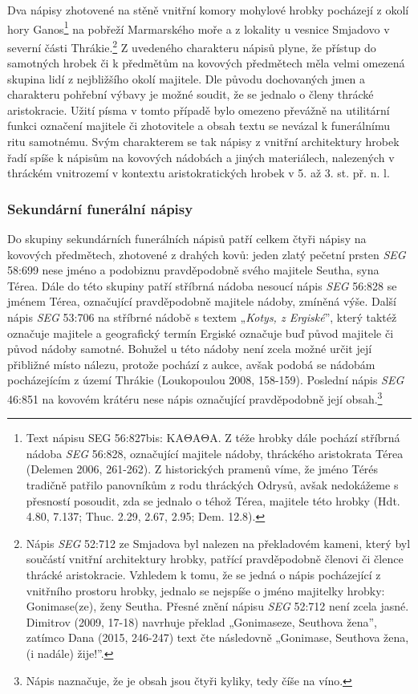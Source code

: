 Dva nápisy zhotovené na stěně vnitřní komory mohylové hrobky pocházejí z okolí hory Ganos\footnote{Text nápisu SEG 56:827bis: ΚΑΘΑΘΑ. Z téže hrobky dále pochází stříbrná nádoba {\em SEG} 56:828, označující majitele nádoby, thráckého aristokrata Térea (Delemen 2006, 261-262). Z historických pramenů víme, že jméno Térés tradičně patřilo panovníkům z rodu thráckých Odrysů, avšak nedokážeme s přesností posoudit, zda se jednalo o téhož Térea, majitele této hrobky (Hdt. 4.80, 7.137; Thuc. 2.29, 2.67, 2.95; Dem. 12.8).} na pobřeží Marmarského moře a z lokality u vesnice Smjadovo v severní části Thrákie.\footnote{Nápis {\em SEG} 52:712 ze Smjadova byl nalezen na překladovém kameni, který byl součástí vnitřní architektury hrobky, patřící pravděpodobně členovi či člence thrácké aristokracie. Vzhledem k tomu, že se jedná o nápis pocházející z vnitřního prostoru hrobky, jednalo se nejspíše o jméno majitelky hrobky: Gonimase(ze), ženy Seutha. Přesné znění nápisu {\em SEG} 52:712 není zcela jasné. Dimitrov (2009, 17-18) navrhuje překlad „Gonimaseze, Seuthova žena”, zatímco Dana (2015, 246-247) text čte následovně „Gonimase, Seuthova žena, (i nadále) žije!”.} Z uvedeného charakteru nápisů plyne, že přístup do samotných hrobek či k předmětům na kovových předmětech měla velmi omezená skupina lidí z nejbližšího okolí majitele. Dle původu dochovaných jmen a charakteru pohřební výbavy je možné soudit, že se jednalo o členy thrácké aristokracie. Užití písma v tomto případě bylo omezeno převážně na utilitární funkci označení majitele či zhotovitele a obsah textu se nevázal k funerálnímu ritu samotnému. Svým charakterem se tak nápisy z vnitřní architektury hrobek řadí spíše k nápisům na kovových nádobách a jiných materiálech, nalezených v thráckém vnitrozemí v kontextu aristokratických hrobek v 5. až 3. st. př. n. l.

\subsubsection[sekundární-funerální-nápisy-1]{Sekundární funerální nápisy}

Do skupiny sekundárních funerálních nápisů patří celkem čtyři nápisy na kovových předmětech, zhotovené z drahých kovů: jeden zlatý pečetní prsten {\em SEG} 58:699 nese jméno a podobiznu pravděpodobně svého majitele Seutha, syna Térea. Dále do této skupiny patří stříbrná nádoba nesoucí nápis {\em SEG} 56:828 se jménem Térea, označující pravděpodobně majitele nádoby, zmíněná výše. Další nápis {\em SEG} 53:706 na stříbrné nádobě s textem „{\em Kotys, z Ergiské}”, který taktéž označuje majitele a geografický termín Ergiské označuje buď původ majitele či původ nádoby samotné. Bohužel u této nádoby není zcela možné určit její přibližné místo nálezu, protože pochází z aukce, avšak podobá se nádobám pocházejícím z území Thrákie (Loukopoulou 2008, 158-159). Poslední nápis {\em SEG} 46:851 na kovovém krátéru nese nápis označující pravděpodobně její obsah.\footnote{Nápis naznačuje, že je obsah jsou čtyři kyliky, tedy číše na víno.}

